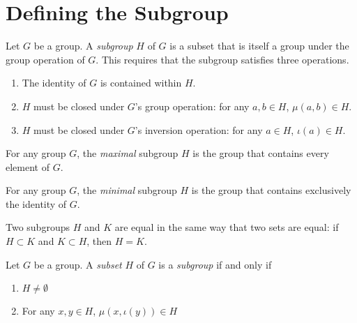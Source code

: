 \section{Defining the Subgroup}

\begin{definition}
    \label{definition : Subgroup}
    \leanok
    Let $G$ be a group. A \textit{subgroup} $H$ of $G$ is a subset that is itself a group under the group operation of $G$. This requires that the subgroup satisfies three operations.

    \begin{enumerate}
        \item The identity of $G$ is contained within $H$.
        \item $H$ must be closed under $G$'s group operation: for any $a,b \in H$, $\mu(a,b) \in H$.
        \item $H$ must be closed under $G$'s inversion operation: for any $a \in H$, $\iota(a) \in H$.
    \end{enumerate}
\end{definition}

\begin{definition}
    \label{definition : Subgroup_Maximal}
    \leanok
    For any group $G$, the \textit{maximal} subgroup $H$ is the group that contains every element of $G$.
\end{definition}

\begin{definition}
    \label{definition : Subgroup_Minimal}
    \leanok
    For any group $G$, the \textit{minimal} subgroup $H$ is the group that contains exclusively the identity of $G$.
\end{definition}

\begin{theorem}
    \label{theorem : Subgroup_ext}
    \leanok
    Two subgroups $H$ and $K$ are equal in the same way that two sets are equal: if $H \subset K$ and $K \subset H$, then $H = K$.
\end{theorem}

\begin{proposition}
    \label{proposition : Subgroup_Criterion}
    \leanok
    Let $G$ be a group. A \textit{subset} $H$ of $G$ is a \textit {subgroup} if and only if
    \begin{enumerate}
        \item $H \neq \emptyset$
        \item For any $x, y \in H$, $\mu(x, \iota (y)) \in H$
    \end{enumerate}
\end{proposition}


